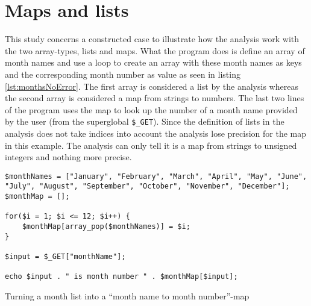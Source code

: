 \section{Maps and lists}
This study concerns a constructed case to illustrate how the analysis work with the two array-types, lists and maps. What the program does is define an array of month names and use a loop to create an array with these month names as keys and the corresponding month number as value as seen in listing \ref{lst:monthsNoError}. The first array is considered a list by the analysis whereas the second array is considered a map from strings to numbers. The last two lines of the program uses the map to look up the number of a month name provided by the user (from the superglobal \texttt{\$\_GET}). Since the definition of lists in the analysis does not take indices into account the analysis lose precision for the map in this example. The analysis can only tell it is a map from strings to unsigned integers and nothing more precise.

\begin{program}
\begin{lstlisting}
$monthNames = ["January", "February", "March", "April", "May", "June", "July", "August", "September", "October", "November", "December"];
$monthMap = [];

for($i = 1; $i <= 12; $i++) {
	$monthMap[array_pop($monthNames)] = $i;
}

$input = $_GET["monthName"];

echo $input . " is month number " . $monthMap[$input];
\end{lstlisting}
\caption{Turning a month list into a ``month name to month number''-map}
\label{lst:monthsNoError}
\end{program}